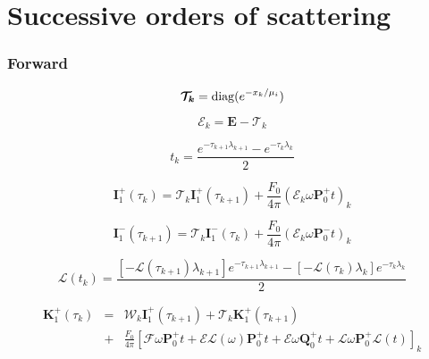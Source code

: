 %
\section{Successive orders of scattering}
\label{sec:sos}


\subsubsection{Forward}
\label{sec:sos-forward}

\begin{equation}
\boldsymbol{\mathcal{T}_{k}} = \mathrm{diag}(e^{-x_{k}/\mu_{i}})
\label{eq:sos-forward-T}
\end{equation}

\begin{equation}
\boldsymbol{\mathcal{E}}_{k} = \mathbf{E} - \boldsymbol{\mathcal{T}}_{k}
\label{eq:sos-forward-E}
\end{equation}

\begin{equation}
t_{k} = \frac{e^{-\tau_{k+1} \lambda_{k+1}} - e^{-\tau_{k} \lambda_{k}}}{2}
\label{eq:sos-forward-btran_mean}
\end{equation}

\begin{equation}
\mathbf{I}^{+}_{1}(\tau_{k}) = \boldsymbol{\mathcal{T}}_{k}\mathbf{I}^{+}_{1}(\tau_{k+1}) + \frac{F_{0}}{4\pi}(\boldsymbol{\mathcal{E}}_{k}\omega\mathbf{P}^{+}_{0}t)_{k}
\label{eq:sos-forward-I_1_p}
\end{equation}

\begin{equation}
\mathbf{I}^{-}_{1}(\tau_{k+1}) = \boldsymbol{\mathcal{T}}_{k}\mathbf{I}^{-}_{1}(\tau_{k}) + \frac{F_{0}}{4\pi}(\boldsymbol{\mathcal{E}}_{k}\omega\mathbf{P}^{-}_{0}t)_{k}
\label{eq:sos-forward-I_1_m}
\end{equation}

\begin{equation}
\mathcal{L}(t_{k}) = \frac{\left[-\mathcal{L}(\tau_{k+1}) \lambda_{k+1}\right] e^{-\tau_{k+1} \lambda_{k+1}} - \left[-\mathcal{L}(\tau_{k}) \lambda_{k}\right] e^{-\tau_{k} \lambda_{k}}}{2}
\label{eq:sos-forward-btran_mean}
\end{equation}

\begin{eqnarray}
\mathbf{K}^{+}_{1}(\tau_{k}) &=& \boldsymbol{\mathcal{W}}_{k}\mathbf{I}^{+}_{1}(\tau_{k+1}) + \boldsymbol{\mathcal{T}}_{k}\mathbf{K}^{+}_{1}(\tau_{k+1}) \nonumber \\
                             &+& \frac{F_{0}}{4\pi} \left[ \boldsymbol{\mathcal{F}}\omega\mathbf{P}^{+}_{0}t + \boldsymbol{\mathcal{E}}\mathcal{L}(\omega)\mathbf{P}^{+}_{0}t + \boldsymbol{\mathcal{E}}\omega\mathbf{Q}^{+}_{0}t + \boldsymbol{\mathcal{L}}\omega\mathbf{P}^{+}_{0}\mathcal{L}(t) \right]_{k}
\label{eq:sos-forward-K_1_p}
\end{eqnarray}


